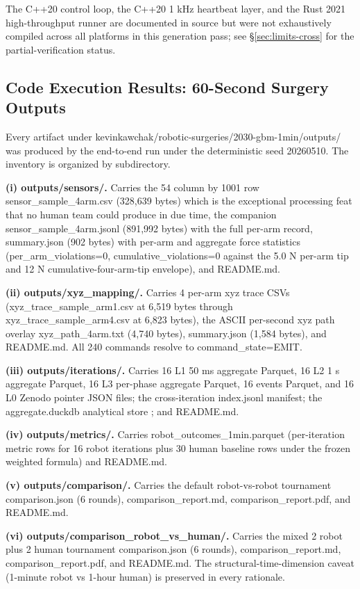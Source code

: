 The C++20 control loop, the C++20 1 kHz heartbeat layer, and the
Rust 2021 high-throughput runner are documented in source but were
not exhaustively compiled across all platforms in this generation
pass; see \S\ref{sec:limits-cross} for the partial-verification
status.

\subsection{Code Execution Results: 60-Second Surgery Outputs}
\label{sec:results-execution}

Every artifact under
kevinkawchak/robotic-surgeries/2030-gbm-1min/outputs/ was produced
by the end-to-end run under the deterministic seed 20260510. The
inventory is organized by subdirectory.

\textbf{(i) outputs/sensors/.} Carries the 54 column by 1001 row
sensor_sample_4arm.csv (328,639 bytes) which is the exceptional
processing feat that no human team could produce in due time, the
companion sensor_sample_4arm.jsonl (891,992 bytes) with the full
per-arm record, summary.json (902 bytes) with per-arm and aggregate
force statistics (per_arm_violations=0, cumulative_violations=0
against the 5.0 N per-arm tip and 12 N cumulative-four-arm-tip
envelope), and README.md.

\textbf{(ii) outputs/xyz_mapping/.} Carries 4 per-arm xyz trace CSVs
(xyz_trace_sample_arm1.csv at 6,519 bytes through
xyz_trace_sample_arm4.csv at 6,823 bytes), the ASCII per-second xyz
path overlay xyz_path_4arm.txt (4,740 bytes), summary.json
(1,584 bytes), and README.md. All 240 commands resolve to
command_state=EMIT.

 

\textbf{(iii) outputs/iterations/.} Carries 16 L1 50 ms aggregate
Parquet, 16 L2 1 s aggregate Parquet, 16 L3 per-phase aggregate
Parquet, 16 events Parquet, and 16 L0 Zenodo pointer JSON files;
the cross-iteration index.jsonl manifest; the aggregate.duckdb
analytical store \cite{apache-arrow, duckdb}; and README.md.

\textbf{(iv) outputs/metrics/.} Carries robot_outcomes_1min.parquet
(per-iteration metric rows for 16 robot iterations plus 30 human
baseline rows under the frozen weighted formula) and README.md.

\textbf{(v) outputs/comparison/.} Carries the default robot-vs-robot
tournament comparison.json (6 rounds), comparison_report.md,
comparison_report.pdf, and README.md.

\textbf{(vi) outputs/comparison_robot_vs_human/.} Carries the mixed
2 robot plus 2 human tournament comparison.json (6 rounds),
comparison_report.md, comparison_report.pdf, and README.md. The
structural-time-dimension caveat (1-minute robot vs 1-hour human) is
preserved in every rationale.

